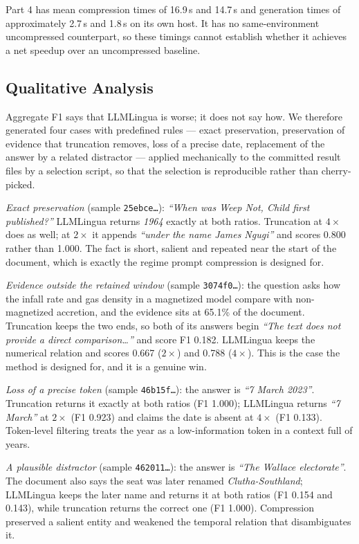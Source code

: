 ﻿\documentclass[10pt,a4paper,twocolumn]{article}
\begin{document}
Part 4 has mean compression times of 16.9\,s and 14.7\,s and generation
times of approximately 2.7\,s and 1.8\,s on its own host. It has no
same-environment uncompressed counterpart, so these timings cannot establish
whether it achieves a net speedup over an uncompressed baseline.

\subsection{Qualitative Analysis}
\label{sec:qual}

Aggregate F1 says that LLMLingua is worse; it does not say how. We therefore
generated four cases with predefined rules --- exact preservation, preservation of
evidence that truncation removes, loss of a precise date, replacement of the
answer by a related distractor --- applied mechanically to the committed result
files by a selection script, so that the selection is
reproducible rather than cherry-picked.

\emph{Exact preservation} (sample \texttt{25ebce\ldots}): \emph{``When was Weep
Not, Child first published?''} LLMLingua returns \emph{1964} exactly at both
ratios. Truncation at $4\times$ does as well; at $2\times$ it appends
\emph{``under the name James Ngugi''} and scores 0.800 rather than 1.000. The
fact is short, salient and repeated near the start of the document, which is
exactly the regime prompt compression is designed for.

\emph{Evidence outside the retained window} (sample \texttt{3074f0\ldots}): the
question asks how the infall rate and gas density in a magnetized model compare
with non-magnetized accretion, and the evidence sits at 65.1\% of the document.
Truncation keeps the two ends, so both of its answers begin \emph{``The text does
not provide a direct comparison\ldots''} and score F1 0.182. LLMLingua keeps the
numerical relation and scores 0.667 ($2\times$) and 0.788 ($4\times$). This is the
case the method is designed for, and it is a genuine win.

\emph{Loss of a precise token} (sample \texttt{46b15f\ldots}): the answer is
\emph{``7 March 2023''}. Truncation returns it exactly at both ratios (F1 1.000);
LLMLingua returns \emph{``7 March''} at $2\times$ (F1 0.923) and claims the date is
absent at $4\times$ (F1 0.133). Token-level filtering treats the year as a
low-information token in a context full of years.

\emph{A plausible distractor} (sample \texttt{462011\ldots}): the answer is
\emph{``The Wallace electorate''}. The document also says the seat was later
renamed \emph{Clutha-Southland}; LLMLingua keeps the later name and returns it at
both ratios (F1 0.154 and 0.143), while truncation returns the correct one
(F1 1.000). Compression preserved a salient entity and weakened the temporal
relation that disambiguates it.
\end{document}
